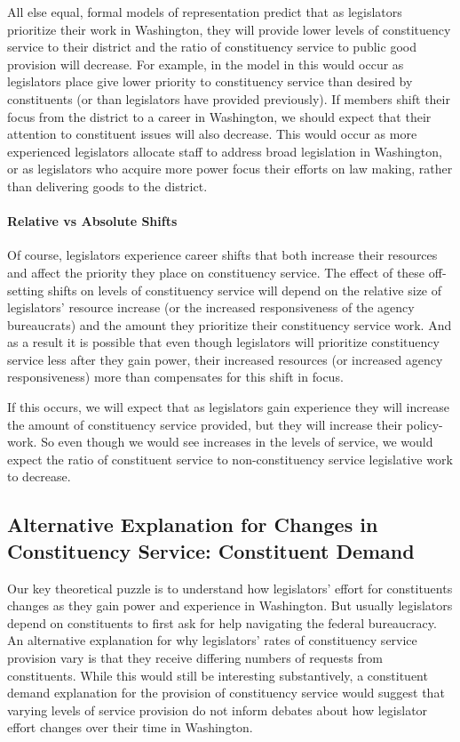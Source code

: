 \documentclass[12pt]{article}
\begin{document}
All else equal, formal models of representation predict that as legislators prioritize their work in Washington,  they will provide lower levels of constituency service to their district and the ratio of constituency service to public good provision will decrease.  For example, in the model in \cite{AshworthBuenodeMesquita2006} this would occur as legislators place give lower priority to constituency service than desired by constituents (or than legislators have provided previously).  If members shift their focus from the district to a career in Washington, we should expect that their attention to constituent issues will also decrease.  This would occur as more experienced legislators allocate staff to address broad legislation in Washington, or as legislators who acquire more power focus their efforts on law making, rather than delivering goods to the district.   


\paragraph{Relative vs Absolute Shifts} Of course, legislators experience career shifts that both increase their resources and affect the priority they place on constituency service.  The effect of these off-setting shifts on levels of constituency service will depend on the relative size of legislators' resource increase (or the increased responsiveness of the agency bureaucrats) and the amount they prioritize their constituency service work. And as a result it is possible that even though legislators will prioritize constituency service less after they gain power, their increased resources (or increased agency responsiveness) more than compensates for this shift in focus.  

If this occurs, we will expect that as legislators gain experience they will increase the amount of constituency service provided, but they will increase their policy-work.  So even though we would see increases in the levels of service, we would expect the ratio of constituent service to non-constituency service legislative work to decrease.  


\subsection{Alternative Explanation for Changes in Constituency Service: Constituent Demand}

Our key theoretical puzzle is to understand how legislators' effort for constituents changes as they gain power and experience in Washington. But usually legislators depend on constituents to first ask for help navigating the federal bureaucracy.  An alternative explanation for why legislators' rates of constituency service provision vary is that they receive differing numbers of requests from constituents.  While this would still be interesting substantively, a constituent demand explanation for the provision of constituency service would suggest that varying levels of service provision do not inform debates about how legislator effort changes over their time in Washington. 
\end{document}
